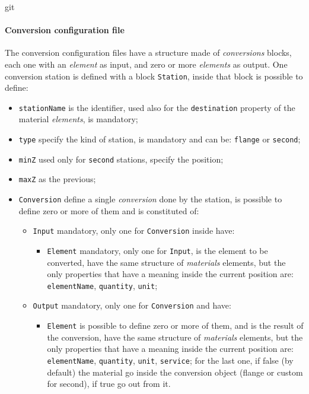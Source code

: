 git\documentclass[12pt, a4paper]{article}
\newcommand{\prop}[1]{\texttt{#1}}
\begin{document}
\paragraph{Conversion configuration file}
The conversion configuration files have a structure made of
\emph{conversions} blocks, each one with an \emph{element} as
input, and zero or more \emph{elements} as output. One conversion
station is defined with a block \prop{Station}, inside that block is
possible to define:
\begin{itemize}
\item \prop{stationName} is the identifier, used also
  for the \prop{destination} property of the material \emph{elements},
  is mandatory;
\item \prop{type} specify the kind of station, is
  mandatory and can be: \prop{flange} or \prop{second};
\item \prop{minZ} used only for \prop{second}
  stations, specify the position;
\item \prop{maxZ} as the previous;
\item \prop{Conversion} define a single \emph{conversion} done by the
  station, is possible to define zero or more of them and is
  constituted of:
  \begin{itemize}
  \item \prop{Input} mandatory, only one for \prop{Conversion} inside have:
    \begin{itemize}
    \item \prop{Element} mandatory, only one for \prop{Input}, is
      the element to be converted, have the same structure of
      \emph{materials} elements, but the only properties that have a
      meaning inside the current position are: \prop{elementName},
      \prop{quantity}, \prop{unit};
    \end{itemize}
  \item \prop{Output} mandatory, only one for
    \prop{Conversion} and have:
    \begin{itemize}
    \item \prop{Element} is possible to define zero or more of them,
      and is the result of the conversion, have the same structure of
      \emph{materials} elements, but the only properties that have a
      meaning inside the current position are: \prop{elementName},
      \prop{quantity}, \prop{unit}, \prop{service}; for the last one, if false (by default) the
      material go inside the conversion object (flange or custom
      for second), if true go out from it.
    \end{itemize}
  \end{itemize}
\end{itemize}
\end{document}

